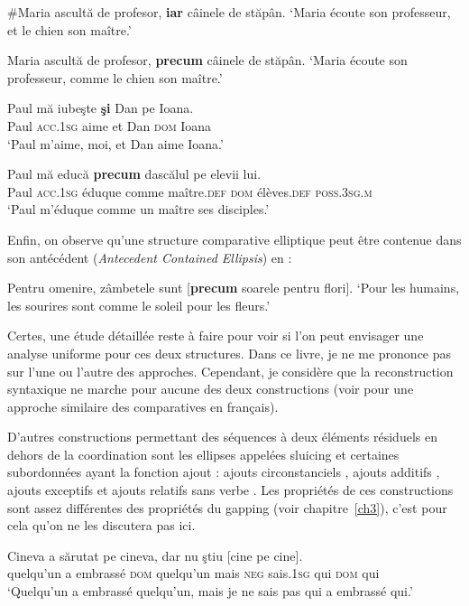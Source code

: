 \ea 
\ea \#Maria ascultă de profesor, \textbf{iar} câinele de stăpân.
\glt ‘Maria écoute son professeur, et le chien son maître.’  

\ex Maria ascultă de profesor, \textbf{precum} câinele de stăpân. \label{ch2:ex68b}
\glt  ‘Maria écoute son professeur, comme le chien son maître.’  
\z
\z


\ea
\ea 
\gll *Paul  mă  iubeşte  \textbf{şi}  Dan  pe  Ioana.\\
Paul  \textsc{acc.1sg} aime  et  Dan  \textsc{dom} Ioana\\
\glt ‘Paul m’aime, moi, et Dan aime Ioana.’  

\ex 
\gll Paul  mă  educă  \textbf{precum}  dascălul  pe  elevii  lui. \label{ch2:ex69b}\\
Paul  \textsc{acc.1sg} éduque  comme  maître.\textsc{def} \textsc{dom} élèves.\textsc{def}  \textsc{poss.3sg.m}\\
\glt ‘Paul m’éduque comme un maître ses disciples.’  
\z
\z

Enfin, on observe qu’une structure comparative elliptique peut être contenue dans son antécédent (\textit{Antecedent Contained Ellipsis}) en  :

\ea \label{ch2:ex70}
Pentru omenire, zâmbetele sunt [\textbf{precum} soarele pentru flori].
\glt ‘Pour les humains, les sourires sont comme le soleil pour les fleurs.’
\z

Certes, une étude détaillée reste à faire pour voir si l’on peut envisager une analyse uniforme pour ces deux structures. Dans ce livre, je ne me prononce pas sur l’une ou l’autre des approches. Cependant, je considère que la reconstruction syntaxique ne marche pour aucune des deux constructions (voir \citealt{AmsiliEtAl2008} pour une approche similaire des comparatives en français). 

D’autres constructions permettant des séquences à deux éléments résiduels en dehors de la coordination sont les ellipses appelées sluicing  et certaines subordonnées ayant la fonction ajout : ajouts circonstanciels , ajouts additifs , ajouts exceptifs  et ajouts relatifs sans verbe . Les propriétés de ces constructions sont assez différentes des propriétés du gapping (voir chapitre~\ref{ch3}), c’est pour cela qu’on ne les discutera pas ici. 


\ea
\ea 
\gll Cineva  a  sărutat  pe  cineva,  dar  nu  ştiu  [cine  pe  cine]. \label{ch2:ex71a}\\
quelqu’un  a  embrassé  \textsc{dom} quelqu’un  mais  \textsc{neg}  sais.\textsc{1sg}  qui  \textsc{dom}  qui\\
\glt ‘Quelqu’un a embrassé quelqu’un, mais je ne sais pas qui a embrassé qui.’

